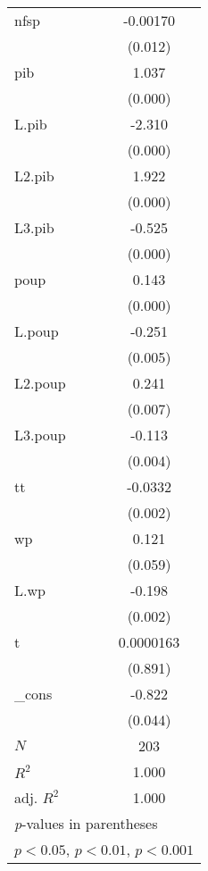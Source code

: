 \begin{table}[htbp]
\begin{tabular}{l*{1}{c}}
\addlinespace
nfsp        &    -0.00170\sym{*}  \\
            &     (0.012)         \\
\addlinespace
pib         &       1.037\sym{***}\\
            &     (0.000)         \\
\addlinespace
L.pib       &      -2.310\sym{***}\\
            &     (0.000)         \\
\addlinespace
L2.pib      &       1.922\sym{***}\\
            &     (0.000)         \\
\addlinespace
L3.pib      &      -0.525\sym{***}\\
            &     (0.000)         \\
\addlinespace
poup        &       0.143\sym{***}\\
            &     (0.000)         \\
\addlinespace
L.poup      &      -0.251\sym{**} \\
            &     (0.005)         \\
\addlinespace
L2.poup     &       0.241\sym{**} \\
            &     (0.007)         \\
\addlinespace
L3.poup     &      -0.113\sym{**} \\
            &     (0.004)         \\
\addlinespace
tt          &     -0.0332\sym{**} \\
            &     (0.002)         \\
\addlinespace
wp          &       0.121         \\
            &     (0.059)         \\
\addlinespace
L.wp        &      -0.198\sym{**} \\
            &     (0.002)         \\
\addlinespace
t           &   0.0000163         \\
            &     (0.891)         \\
\addlinespace
\_cons      &      -0.822\sym{*}  \\
            &     (0.044)         \\
\midrule
\(N\)       &         203         \\
\(R^{2}\)   &       1.000         \\
adj. \(R^{2}\)&       1.000         \\
\bottomrule
\multicolumn{2}{l}{\footnotesize \textit{p}-values in parentheses}\\
\multicolumn{2}{l}{\footnotesize \sym{*} \(p<0.05\), \sym{**} \(p<0.01\), \sym{***} \(p<0.001\)}\\
\end{tabular}
\end{table}
